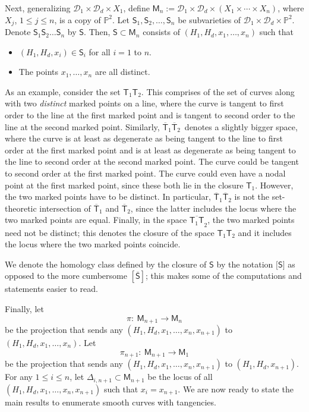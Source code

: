 \documentclass[pdftex]{sigma}
\numberwithin{equation}{section}
\begin{document}
Next, generalizing $\mathcal{D}_1 \times \mathcal{D}_d \times X_1$, define
$
\mathsf{M}_n :=  \mathcal{D}_1 \times \mathcal{D}_d \times (X_1\times \cdots\times X_n)$,
where $X_j$, $1 \leq j \leq n$, is a copy of $\mathbb{P}^2$.
Let $\mathsf{S}_1, \mathsf{S}_2, \dots, \mathsf{S}_n$ be subvarieties of
$\mathcal{D}_1 \times \mathcal{D}_d \times \mathbb{P}^2$.
Denote $\mathsf{S}_1 \mathsf{S}_2 \dots \mathsf{S}_n$ by $\mathsf{S}$. Then,
$\mathsf{S} \subset \mathsf{M}_n$
consists of
$(H_1, H_d, x_1,\dots, x_n)$ such that
\begin{itemize}\itemsep=0pt
\item $(H_1, H_d, x_i) \in \mathsf{S}_i$ for all $i=1$ to $n$.
\item The points $x_1,\dots, x_n$ are all distinct.
\end{itemize}
As an example, consider the set $\mathsf{T}_1 \mathsf{T}_2$. This comprises of the set of
curves along with two \textit{distinct} marked points on a line, where the curve is tangent to first order to
the line at the first marked point and is tangent to second order to the line at the
second marked point.
Similarly, $\overline{\mathsf{T}}_1 \overline{\mathsf{T}}_2$~denotes a slightly bigger space, where the curve is
at least as degenerate as being tangent to the line to first order at the first marked
point and is at least
as degenerate as being tangent to the line to second order at the second marked point.
The curve could be tangent to second order at the first marked point. The curve could even have a nodal
point at the first marked point, since these both lie in the closure $\mathsf{T}_1$.
However, the two marked points have to be distinct.
In particular, $\overline{\mathsf{T}}_1 \overline{\mathsf{T}}_2$
is not the set-theoretic intersection of
$\overline{\mathsf{T}}_1$ and $\overline{\mathsf{T}}_2$, since the latter
includes the locus where the two marked points are equal.
Finally, in the space
$\overline{\mathsf{T}_1 \mathsf{T}}_2$, the two marked points need not be distinct; this denotes the
closure of the space $\mathsf{T}_1 \mathsf{T}_2$ and it includes the locus where the two marked points coincide.

We denote the homology class defined by the closure of $\mathsf{S}$
by the notation $\big[\mathsf{S}\big]$ as opposed to the more cumbersome $[\overline{\mathsf{S}}]$; this makes
some of the computations and statements easier to read.

Finally, let
\begin{equation}\label{ep}
\pi \colon\ \mathsf{M}_{n+1} \longrightarrow \mathsf{M}_n
\end{equation}
be the projection that sends
any $(H_1, H_d, x_1, \dots, x_{n}, x_{n+1})$ to $(H_1, H_d, x_1, \dots, x_{n})$. Let
\begin{equation}\label{ep1}
\pi_{n+1} \colon\  \mathsf{M}_{n+1} \longrightarrow \mathsf{M}_1
\end{equation}
be the projection that sends any $(H_1, H_d, x_1, \dots, x_{n}, x_{n+1})$ to
$(H_1, H_d, x_{n+1})$. For any $1 \leq i \leq n$, let
$
\Delta_{i, {n+1}}  \subset  \mathsf{M}_{n+1}
$
be the locus of all $(H_1, H_d, x_1, \dots, x_{n}, x_{n+1})$ such that $x_i = x_{n+1}$.
We are now ready to state the main results to enumerate smooth curves with tangencies.
\end{document}
